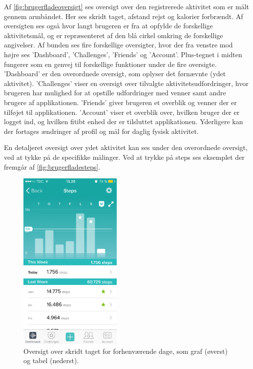 Af \autoref{fig:brugerfladeoversigt} ses oversigt over den registrerede aktivitet som er målt gennem armbåndet. Her ses skridt taget, afstand rejst og kalorier forbrændt. Af oversigten ses også hvor langt brugeren er fra at opfylde de forskellige aktivitetsmål, og er repræsenteret af den blå cirkel omkring de forskellige angivelser. 
Af bunden ses fire forskellige oversigter, hvor der fra venstre mod højre ses 'Dashboard', 'Challenges', 'Friends' og 'Account'. Plus-tegnet i midten fungerer som en genvej til forskellige funktioner under de fire oversigte. 
'Dashboard' er den overordnede oversigt, som oplyser det førnævnte (ydet aktivitet). 
'Challenges' viser en oversigt over tilvalgte aktivitetsudfordringer, hvor brugeren har mulighed for at opstille udfordringer med venner samt andre brugere af applikationen. 
'Friends' giver brugeren et overblik og venner der er tilføjet til applikationen. 
'Account' viser et overblik over, hvilken bruger der er logget ind, og hvilken fitibt enhed der er tilsluttet applikationen. Yderligere kan der fortages ændringer af profil og mål for daglig fysisk aktivitet. 

En detaljeret oversigt over ydet aktivitet kan ses under den overordnede oversigt, ved at tykke på de specifikke målinger. Ved at trykke på steps ses eksemplet der fremgår af \autoref{fig:brugerfladesteps}.  

\begin{figure}[H]
	\centering
	\includegraphics[width=0.45\textwidth]{figures/brugerfladesteps}
	\caption{Oversigt over skridt taget for forhenværende dage, som graf (øverst) og tabel (nederst).}
	\label{fig:brugerfladesteps}
\end{figure}

